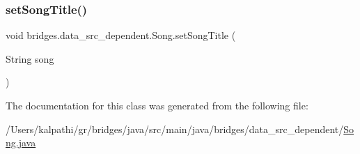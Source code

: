 \subsubsection{\texorpdfstring{setSongTitle()}{setSongTitle()}}
{\footnotesize\ttfamily void bridges.\+data\+\_\+src\+\_\+dependent.\+Song.\+set\+Song\+Title (\begin{DoxyParamCaption}\item[{String}]{song }\end{DoxyParamCaption})}



The documentation for this class was generated from the following file\+:\begin{DoxyCompactItemize}
\item 
/\+Users/kalpathi/gr/bridges/java/src/main/java/bridges/data\+\_\+src\+\_\+dependent/\mbox{\hyperlink{_song_8java}{Song.\+java}}\end{DoxyCompactItemize}
